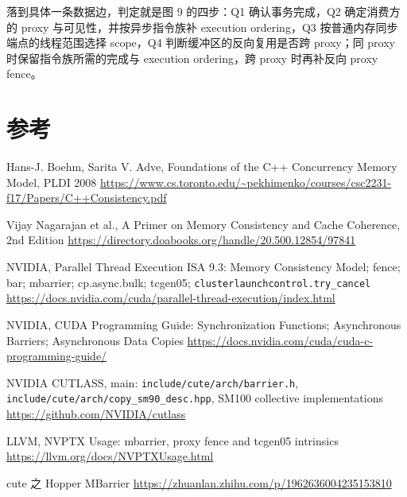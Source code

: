 落到具体一条数据边，判定就是图 9 的四步：Q1 确认事务完成，Q2 确定消费方的 proxy 与可见性，并按异步指令族补 execution ordering，Q3 按普通内存同步端点的线程范围选择 scope，Q4 判断缓冲区的反向复用是否跨 proxy；同 proxy 时保留指令族所需的完成与 execution ordering，跨 proxy 时再补反向 proxy fence。

\section{参考}

Hans-J. Boehm, Sarita V. Adve, Foundations of the C++ Concurrency Memory Model, PLDI 2008 \url{https://www.cs.toronto.edu/~pekhimenko/courses/csc2231-f17/Papers/C++Consistency.pdf}

Vijay Nagarajan et al., A Primer on Memory Consistency and Cache Coherence, 2nd Edition \url{https://directory.doabooks.org/handle/20.500.12854/97841}

NVIDIA, Parallel Thread Execution ISA 9.3: Memory Consistency Model; fence; bar; mbarrier; cp.async.bulk; tcgen05; \lstinline|clusterlaunchcontrol.try_cancel| \url{https://docs.nvidia.com/cuda/parallel-thread-execution/index.html}

NVIDIA, CUDA Programming Guide: Synchronization Functions; Asynchronous Barriers; Asynchronous Data Copies \url{https://docs.nvidia.com/cuda/cuda-c-programming-guide/}

NVIDIA CUTLASS, main: \lstinline|include/cute/arch/barrier.h|, \lstinline|include/cute/arch/copy_sm90_desc.hpp|, SM100 collective implementations \url{https://github.com/NVIDIA/cutlass}

LLVM, NVPTX Usage: mbarrier, proxy fence and tcgen05 intrinsics \url{https://llvm.org/docs/NVPTXUsage.html}

cute 之 Hopper MBarrier \url{https://zhuanlan.zhihu.com/p/1962636004235153810}
